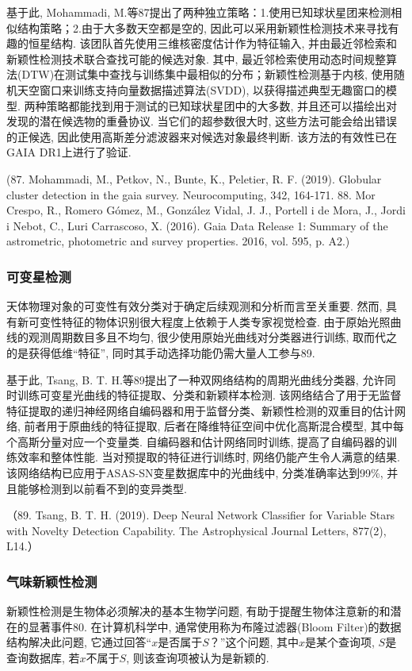 \documentclass{Style/aas}
\begin{document}
\begin{multicols}{2}
基于此, Mohammadi, M.等87提出了两种独立策略：1.使用已知球状星团来检测相似结构策略；2.由于大多数天空都是空的,  因此可以采用新颖性检测技术来寻找有趣的恒星结构. 该团队首先使用三维核密度估计作为特征输入, 并由最近邻检索和新颖性检测技术联合查找可能的候选对象. 其中, 最近邻检索使用动态时间规整算法(DTW)在测试集中查找与训练集中最相似的分布；新颖性检测基于内核, 使用随机天空窗口来训练支持向量数据描述算法(SVDD), 以获得描述典型无趣窗口的模型. 两种策略都能找到用于测试的已知球状星团中的大多数, 并且还可以描绘出对发现的潜在候选物的重叠协议. 当它们的超参数很大时, 这些方法可能会给出错误的正候选, 因此使用高斯差分滤波器来对候选对象最终判断. 该方法的有效性已在GAIA DR1上进行了验证.

(87.	Mohammadi, M., Petkov, N., Bunte, K., Peletier, R. F. (2019). Globular cluster detection in the gaia survey. Neurocomputing, 342, 164-171.
88.	Mor Crespo, R., Romero Gómez, M., González Vidal, J. J., Portell i de Mora, J., Jordi i Nebot, C., Luri Carrascoso, X. (2016). Gaia Data Release 1: Summary of the astrometric, photometric and survey properties. 2016, vol. 595, p. A2.)

\subsubsection{可变星检测}
天体物理对象的可变性有效分类对于确定后续观测和分析而言至关重要. 然而, 具有新可变性特征的物体识别很大程度上依赖于人类专家视觉检查. 由于原始光照曲线的观测周期数目多且不均匀, 很少使用原始光曲线对分类器进行训练, 取而代之的是获得低维“特征”, 同时其手动选择功能仍需大量人工参与89. 

基于此, Tsang, B. T. H.等89提出了一种双网络结构的周期光曲线分类器, 允许同时训练可变星光曲线的特征提取、分类和新颖样本检测. 该网络结合了用于无监督特征提取的递归神经网络自编码器和用于监督分类、新颖性检测的双重目的估计网络, 前者用于原曲线的特征提取, 后者在降维特征空间中优化高斯混合模型, 其中每个高斯分量对应一个变量类. 自编码器和估计网络同时训练, 提高了自编码器的训练效率和整体性能. 当对预提取的特征进行训练时, 网络仍能产生令人满意的结果. 该网络结构已应用于ASAS-SN变星数据库中的光曲线中, 分类准确率达到99\%, 并且能够检测到以前看不到的变异类型.

（89.	Tsang, B. T. H. (2019). Deep Neural Network Classifier for Variable Stars with Novelty Detection Capability. The Astrophysical Journal Letters, 877(2), L14.）

\subsubsection{气味新颖性检测}
新颖性检测是生物体必须解决的基本生物学问题, 有助于提醒生物体注意新的和潜在的显著事件80. 在计算机科学中, 通常使用称为布隆过滤器(Bloom Filter)的数据结构解决此问题, 它通过回答“$x$是否属于$S$？”这个问题, 其中$x$是某个查询项, $S$是查询数据库, 若$x$不属于$S$, 则该查询项被认为是新颖的. 


\end{multicols}
\end{document}
